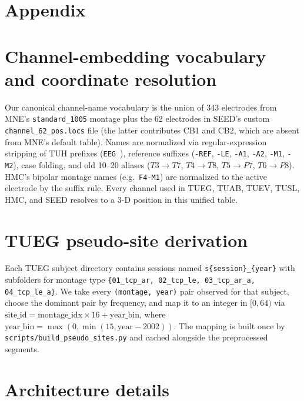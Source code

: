 \appendix

\newpage
\section*{Appendix}

\section{Channel-embedding vocabulary and coordinate resolution}
\label{app:channel_vocab}

Our canonical channel-name vocabulary is the union of 343 electrodes from MNE's \texttt{standard\_1005} montage plus the 62 electrodes in SEED's custom \texttt{channel\_62\_pos.locs} file (the latter contributes CB1 and CB2, which are absent from MNE's default table). Names are normalized via regular-expression stripping of TUH prefixes (\texttt{EEG\ }), reference suffixes (\texttt{-REF}, \texttt{-LE}, \texttt{-A1}, \texttt{-A2}, \texttt{-M1}, \texttt{-M2}), case folding, and old 10--20 aliases ($T3\!\to\!T7$, $T4\!\to\!T8$, $T5\!\to\!P7$, $T6\!\to\!P8$). HMC's bipolar montage names (e.g.\ \texttt{F4-M1}) are normalized to the active electrode by the suffix rule. Every channel used in TUEG, TUAB, TUEV, TUSL, HMC, and SEED resolves to a 3-D position in this unified table.

\section{TUEG pseudo-site derivation}
\label{app:pseudo_sites}

Each TUEG subject directory contains sessions named \texttt{s\{session\}\_\{year\}} with subfolders for montage type \texttt{\{01\_tcp\_ar, 02\_tcp\_le, 03\_tcp\_ar\_a, 04\_tcp\_le\_a\}}. We take every \texttt{(montage, year)} pair observed for that subject, choose the dominant pair by frequency, and map it to an integer in $[0, 64)$ via $\mathrm{site\_id}\!=\!\mathrm{montage\_idx}\!\times\!16 + \mathrm{year\_bin}$, where $\mathrm{year\_bin}\!=\!\max(0,\min(15, \text{year}-2002))$. The mapping is built once by \texttt{scripts/build\_pseudo\_sites.py} and cached alongside the preprocessed segments.

\section{Architecture details}
\label{app:arch_details}

